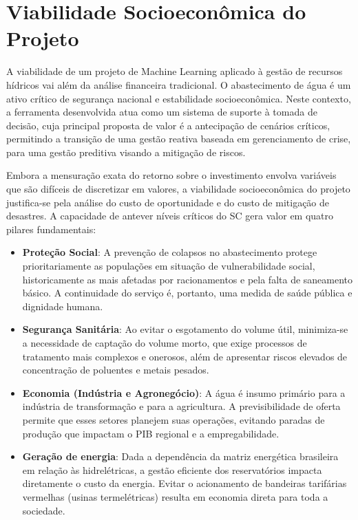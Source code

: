 \section{Viabilidade Socioeconômica do Projeto}

A viabilidade de um projeto de Machine Learning aplicado à gestão de recursos hídricos vai além da análise financeira tradicional. O abastecimento de água é um ativo crítico de segurança nacional e estabilidade socioeconômica. Neste contexto, a ferramenta desenvolvida atua como um sistema de suporte à tomada de decisão, cuja principal proposta de valor é a antecipação de cenários críticos, permitindo a transição de uma gestão reativa baseada em gerenciamento de crise, para uma gestão preditiva visando a mitigação de riscos.

Embora a mensuração exata do retorno sobre o investimento envolva variáveis que são difíceis de discretizar em valores, a viabilidade socioeconômica do projeto justifica-se pela análise do custo de oportunidade e do custo de mitigação de desastres. A capacidade de antever níveis críticos do \acrshort{SC} gera valor em quatro pilares fundamentais:

\begin{itemize}
\item \textbf{Proteção Social}: A prevenção de colapsos no abastecimento protege prioritariamente as populações em situação de vulnerabilidade social, historicamente as mais afetadas por racionamentos e pela falta de saneamento básico. A continuidade do serviço é, portanto, uma medida de saúde pública e dignidade humana.

\item \textbf{Segurança Sanitária}: Ao evitar o esgotamento do volume útil, minimiza-se a necessidade de captação do volume morto, que exige processos de tratamento mais complexos e onerosos, além de apresentar riscos elevados de concentração de poluentes e metais pesados.

\item \textbf{Economia (Indústria e Agronegócio)}: A água é insumo primário para a indústria de transformação e para a agricultura. A previsibilidade de oferta permite que esses setores planejem suas operações, evitando paradas de produção que impactam o PIB regional e a empregabilidade.

\item \textbf{Geração de energia}: Dada a dependência da matriz energética brasileira em relação às hidrelétricas, a gestão eficiente dos reservatórios impacta diretamente o custo da energia. Evitar o acionamento de bandeiras tarifárias vermelhas (usinas termelétricas) resulta em economia direta para toda a sociedade.
\end{itemize}

